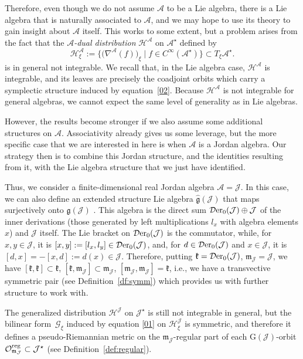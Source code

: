\documentclass[10pt,a4paper]{amsart}
\numberwithin{equation}{section}
\newcommand{\hh}{\mathcal{H}}
\newcommand{\Der}{\mathcal{D}{\rm er}}
\newcommand{\ocal}{\mathcal{O}}
\newcommand{\Jcal}{\mathcal{J}}
\newcommand{\m}{\mathfrak{m}}
\newcommand{\G}{\mathrm{G}}
\newcommand{\g}{{\mathfrak{g}}}
\renewcommand{\k}{{\mathfrak k}}
\renewcommand{\m}{{\mathfrak m}}
\newcommand{\cA}{\mathcal{A}}
\newcommand{\Gcal}{\mathcal{G}}
\begin{document}
Therefore, even though we do not assume $\cA$ to be a Lie algebra, there is a Lie algebra that is naturally associated to $\cA$, and we may hope to use its theory to gain insight about $\cA$ itself.
This works to some extent, but a problem arises from the fact that the {\em $\cA$-dual distribution} $\hh^\cA$ on $\cA^\star$ defined by
\[%
\hh^\cA_\xi := \big\{ \big(\nabla^\cA(f)\big)_\xi \mid f \in C^\infty(\cA^\star)\big\} %
\subset T_\xi \cA^\star.
\]
is in general not integrable.
We recall that, in the Lie algebra case, $\hh^\cA$ is integrable, and its leaves are precisely the coadjoint orbits which carry a symplectic structure induced by equation~\eqref{02}.
Because $\hh^\cA$ is not integrable for general algebras, we cannot expect the same level of generality as in Lie algebras.

However, the results become stronger if we also assume some additional structures on $\cA$.
Associativity already gives us some leverage, but the more specific case that we are interested in here is when $\cA$ is a Jordan algebra.
Our strategy then is to combine this Jordan structure, and the identities resulting from it, with the Lie algebra structure that we just have identified.

Thus, we consider a finite-dimensional real Jordan algebra $\cA = \Jcal$.
In this case, we can also define an extended structure Lie algebra $\hat \g(\Jcal)$ that maps surjectively onto $\g(\Jcal)$ \cite{Bertram-2000,Koecher-1999,L-L-2022}.
This algebra is the direct sum $\Der_0(\Jcal) \oplus \Jcal$ of the inner derivations (those generated by left multiplications $l_x$ with algebra elements $x$) and $\Jcal$ itself.
The Lie bracket on $\Der_0(\Jcal)$ is the commutator, while, for $x,y \in \Jcal$, it is $[x,y] := [l_x, l_y] \in \Der_0(\Jcal)$, and, for $d\in \Der_0(\Jcal)$ and $x \in \Jcal$, it is $[d, x] = - [x, d] := d(x) \in
\Jcal$.
Therefore, putting $\k =\Der_0(\Jcal)$, $\m_{\Jcal}= \Jcal$, we have $[\k, \k] \subset \k$, $[\k, \m_{\Jcal}] \subset \m_{\Jcal}$, $[ \m_{\Jcal}, \m_{\Jcal}] = \k$, i.e., we have a transvective symmetric pair (see Definition~\ref{df:symm}) which provides us with further structure to work with.

The generalized distribution $\hh^\Jcal$ on $\Jcal^\star$ is still not integrable in general, but the bilinear form~$\Gcal_\xi$ induced by equation \eqref{01} on $\hh^\Jcal_\xi$ is symmetric, and therefore it defines a pseudo-Riemannian metric on the $ \m_{\Jcal}$-regular part of each $\G(\Jcal)$-orbit $\ocal^{\rm reg}_{\m_{\Jcal}} \subset \Jcal^\star$ (see Definition~\ref{def:regular}).
\end{document}
